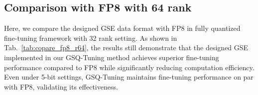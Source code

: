 % 

\subsection{Comparison with FP8 with 64 rank}
Here, we compare the designed GSE data format with FP8 in fully quantized fine-tuning framework with 32 rank setting. As shown in Tab.~\ref{tab:copare_fp8_r64}, the results still demonstrate that the designed GSE implemented in our GSQ-Tuning method achieves superior fine-tuning performance compared to FP8 while significantly reducing computation efficiency. Even under 5-bit settings, GSQ-Tuning maintains fine-tuning performance on par with FP8, validating its effectiveness.
